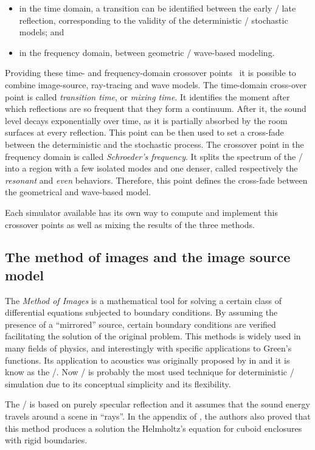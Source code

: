 \begin{itemize}
    \item in the time domain, a transition can be identified between the early \vs/ late reflection, corresponding to the validity of the deterministic \vs/ stochastic models; and
    \item in the frequency domain, between geometric \vs/ wave-based modeling.
\end{itemize}
Providing these time- and frequency-domain crossover points~ it is possible to combine image-source, ray-tracing and wave models.
The time-domain cross-over point is called \textit{transition time}, or \textit{mixing time}.
It identifies the moment after which reflections are so frequent that they form a continuum.
After it, the sound level decays exponentially over time, as it is partially absorbed by the room surfaces at every reflection.
This point can be then used to set a cross-fade between the deterministic and the stochastic process.
The crossover point in the frequency domain is called \textit{Schroeder's frequency}.
It splits the spectrum of the \RIR/ into a region with a few isolated modes and one denser, called respectively the \textit{resonant} and \textit{even} behaviors.
Therefore, this point defines the cross-fade between the geometrical and wave-based model.

\mynewline
Each simulator available has its own way to compute and implement this crossover points as well as mixing the results of the three methods.

\subsection{The method of images and the image source model}\label{subsec:acoustics:ism}
The \textit{Method of Images} is a mathematical tool for solving a certain class of differential equations subjected to boundary conditions.
By assuming the presence of a ``mirrored'' source, certain boundary conditions are verified facilitating the solution of the original problem.
This methods is widely used in many fields of physics, and interestingly with specific applications to Green's functions.
Its application to acoustics was originally proposed by \citeauthor{allen1979image} in  and it is know as the \ISMdef/.
Now \ISM/ is probably the most used technique for deterministic \RIR/ simulation due to its conceptual simplicity and its flexibility.

\mynewline
The \ISM/ is based on purely specular reflection and it assumes that the sound energy travels around a scene in ``rays''.
In the appendix of , the authors also proved that this method produces a solution the Helmholtz's equation
for cuboid enclosures with rigid boundaries.


